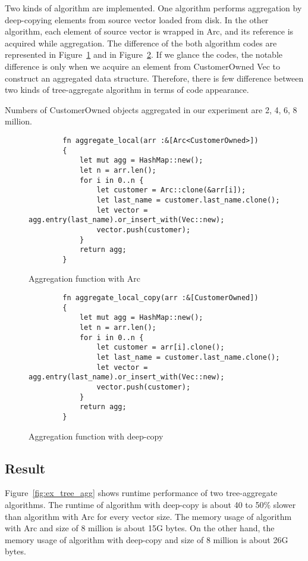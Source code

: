 Two kinds of algorithm are implemented. One algorithm performs aggregation by deep-copying elements from source vector loaded from disk. 
In the other algorithm, each element of source vector is wrapped in Arc, and its reference is acquired while aggregation. 
The difference of the both algorithm codes are represented in Figure~\ref{fig:arc_tree} and in Figure~\ref{fig:deep_tree}.
If we glance the codes, the notable difference is only when we acquire an element from CustomerOwned Vec to construct an aggregated data structure.
Therefore, there is few difference between two kinds of tree-aggregate algorithm in terms of code appearance.

Numbers of CustomerOwned objects aggregated in our experiment are 2, 4, 6, 8 million. 

\begin{figure}[htb]
    \begin{lstlisting}
        fn aggregate_local(arr :&[Arc<CustomerOwned>]) 
        {   
            let mut agg = HashMap::new();
            let n = arr.len();
            for i in 0..n {
                let customer = Arc::clone(&arr[i]);
                let last_name = customer.last_name.clone();
                let vector = agg.entry(last_name).or_insert_with(Vec::new);
                vector.push(customer);
            }
            return agg;
        }
    \end{lstlisting}
    \caption{Aggregation function with Arc}
    \label{fig:arc_tree}
\end{figure}


\begin{figure}[htb]
    \begin{lstlisting}
        fn aggregate_local_copy(arr :&[CustomerOwned]) 
        {   
            let mut agg = HashMap::new();
            let n = arr.len();
            for i in 0..n {
                let customer = arr[i].clone();
                let last_name = customer.last_name.clone();
                let vector = agg.entry(last_name).or_insert_with(Vec::new);
                vector.push(customer);
            }
            return agg;
        }
    \end{lstlisting}
    \caption{Aggregation function with deep-copy}
    \label{fig:deep_tree}
\end{figure}


\subsection{Result}
Figure~\ref{fig:ex_tree_agg} shows runtime performance of two tree-aggregate algorithms. 
The runtime of algorithm with deep-copy is about 40 to 50\% slower than algorithm with Arc for every vector size. 
The memory usage of algorithm with Arc and size of 8 million is about 15G bytes. On the other hand, 
the memory usage of algorithm with deep-copy and size of 8 million is about 26G bytes.

